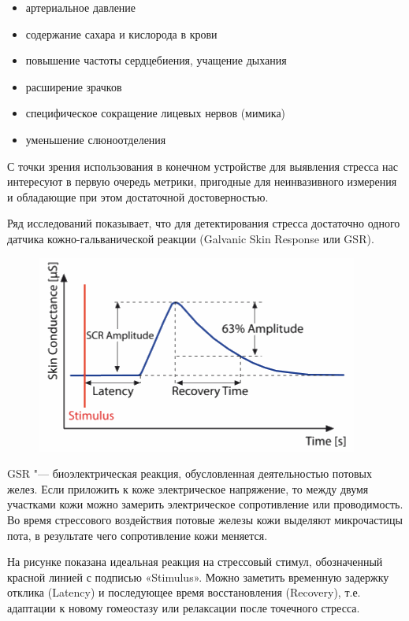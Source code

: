 \documentclass[10pt, a5paper]{article}
\begin{document}
\begin{itemize}
  \item артериальное давление
  \item содержание сахара и кислорода в крови
  \item повышение частоты сердцебиения, учащение дыхания
  \item расширение зрачков
  \item специфическое сокращение лицевых нервов (мимика)
  \item уменьшение слюноотделения
\end{itemize}

С точки зрения использования в конечном устройстве для выявления стресса нас интересуют в первую очередь метрики, пригодные для неинвазивного измерения и обладающие при этом достаточной достоверностью.

Ряд исследований показывает, что для детектирования стресса достаточно одного датчика кожно-гальванической реакции (Galvanic Skin Response или GSR).

\begin{figure}[h!]
  \centering
  \includegraphics{107_2014_w_Karabutova_plot.png}
\end{figure}

GSR "--- биоэлектрическая реакция, обусловленная деятельностью потовых желез. Если приложить к коже электрическое напряжение, то между двумя участками кожи можно замерить электрическое сопротивление или проводимость. Во время стрессового воздействия потовые железы кожи выделяют микрочастицы пота, в результате чего сопротивление кожи меняется.

На рисунке показана идеальная реакция на стрессовый стимул, обозначенный красной линией с подписью «Stimulus». Можно заметить временную задержку отклика (Latency) и последующее время восстановления (Recovery), т.е. адаптации к новому гомеостазу или релаксации после точечного стресса.
\end{document}
